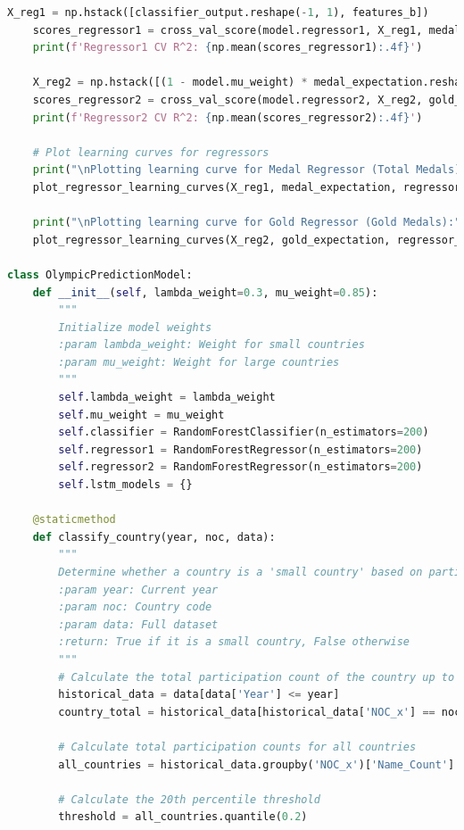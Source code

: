 \documentclass[12pt]{article}
\begin{document}
\begin{lstlisting}[language=Python, style=mystyle, caption=model.ipynb]
    X_reg1 = np.hstack([classifier_output.reshape(-1, 1), features_b])
    scores_regressor1 = cross_val_score(model.regressor1, X_reg1, medal_expectation, cv=5)
    print(f'Regressor1 CV R^2: {np.mean(scores_regressor1):.4f}')
    
    X_reg2 = np.hstack([(1 - model.mu_weight) * medal_expectation.reshape(-1, 1), model.mu_weight * features_c])
    scores_regressor2 = cross_val_score(model.regressor2, X_reg2, gold_expectation, cv=5)
    print(f'Regressor2 CV R^2: {np.mean(scores_regressor2):.4f}')
    
    # Plot learning curves for regressors
    print("\nPlotting learning curve for Medal Regressor (Total Medals):")
    plot_regressor_learning_curves(X_reg1, medal_expectation, regressor_name="Medal Regressor")
    
    print("\nPlotting learning curve for Gold Regressor (Gold Medals):")
    plot_regressor_learning_curves(X_reg2, gold_expectation, regressor_name="Gold Regressor")

class OlympicPredictionModel:
    def __init__(self, lambda_weight=0.3, mu_weight=0.85):
        """
        Initialize model weights
        :param lambda_weight: Weight for small countries
        :param mu_weight: Weight for large countries
        """
        self.lambda_weight = lambda_weight
        self.mu_weight = mu_weight
        self.classifier = RandomForestClassifier(n_estimators=200)
        self.regressor1 = RandomForestRegressor(n_estimators=200)
        self.regressor2 = RandomForestRegressor(n_estimators=200)
        self.lstm_models = {}

    @staticmethod
    def classify_country(year, noc, data):
        """
        Determine whether a country is a 'small country' based on participation history
        :param year: Current year
        :param noc: Country code
        :param data: Full dataset
        :return: True if it is a small country, False otherwise
        """
        # Calculate the total participation count of the country up to the given year
        historical_data = data[data['Year'] <= year]
        country_total = historical_data[historical_data['NOC_x'] == noc]['Name_Count'].sum()
        
        # Calculate total participation counts for all countries
        all_countries = historical_data.groupby('NOC_x')['Name_Count'].sum()
        
        # Calculate the 20th percentile threshold
        threshold = all_countries.quantile(0.2)
        

\end{lstlisting}
\end{document}
